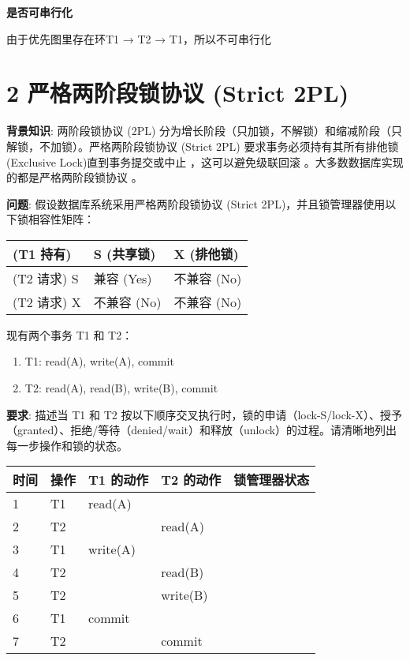 \documentclass{article}
\begin{document}
	\textbf{是否可串行化}
	
	由于优先图里存在环T1 → T2 → T1，所以不可串行化
	
	\section*{2 严格两阶段锁协议 (Strict 2PL)}
	
	\textbf{背景知识}: 两阶段锁协议 (2PL) 分为增长阶段（只加锁，不解锁）和缩减阶段（只解锁，不加锁）。严格两阶段锁协议 (Strict 2PL) 要求事务必须持有其所有排他锁 (Exclusive Lock)直到事务提交或中止 ，这可以避免级联回滚 。大多数数据库实现的都是严格两阶段锁协议 。
	
	\textbf{问题}: 假设数据库系统采用严格两阶段锁协议 (Strict 2PL)，并且锁管理器使用以下锁相容性矩阵：
	
	\begin{table}[!ht]
		\centering
		\begin{tabular}{|l|l|l|}
			\hline
			(T1 持有) & S (共享锁) & X (排他锁)  \\ \hline
			(T2 请求) S & 兼容 (Yes) & 不兼容 (No)  \\ \hline
			(T2 请求) X & 不兼容 (No) & 不兼容 (No)  \\ \hline
		\end{tabular}
	\end{table}
	
	现有两个事务 T1 和 T2：
	
	\begin{enumerate}[noitemsep, label={{\arabic*})}]
		\item T1: read(A), write(A), commit
		\item T2: read(A), read(B), write(B), commit
	\end{enumerate}\textbf{}
	
	\textbf{要求}: 描述当 T1 和 T2 按以下顺序交叉执行时，锁的申请（lock-S/lock-X）、授予（granted）、拒绝/等待（denied/wait）和释放（unlock）的过程。请清晰地列出每一步操作和锁的状态。
	
	\begin{table}[H]
		\centering
		\begin{tabular}{|l|l|l|l|l|}
			\hline
			时间 & 操作 & T1 的动作 & T2 的动作 & 锁管理器状态  \\ \hline
			1 & T1 & read(A) & ~ &   \\ \hline
			2 & T2 & ~ & read(A) &   \\ \hline
			3 & T1 & write(A) & ~ &   \\ \hline
			4 & T2 & ~ & read(B) &   \\ \hline
			5 & T2 & ~ & write(B) &   \\ \hline
			6 & T1 & commit & ~ &   \\ \hline
			7 & T2 & ~ & commit &   \\ \hline
		\end{tabular}
	\end{table}
	
\end{document}
